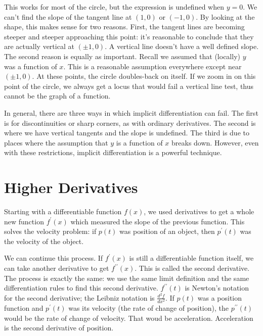 \documentclass[fleqn]{report}
\begin{document}
This works for most of the circle, but the expression is
undefined when $y=0$. We can't find the slope of the
tangent line at $(1,0)$ or $(-1,0)$. By looking at the shape,
this makes sense for two reasons. First, the tangent lines
are becoming steeper and steeper approaching this point: it's
reasonable to conclude that they are actually vertical at
$(\pm 1,0)$. A vertical line doesn't have a well defined
slope. The second reason is equally as important. Recall we
assumed that (locally) $y$ was a function of $x$. This is a
reasonable assumption everywhere except near $(\pm 1,0)$. At
these points, the circle doubles-back on itself. If we zoom
in on this point of the circle, we always get a locus that
would fail a vertical line test, thus cannot be the graph of a
function.

In general, there are three ways in which implicit
differentiation can fail. The first is for discontinuities or
sharp corners, as with ordinary derivatives. The second is
where we have vertical tangents and the slope is undefined.
The third is due to places where the assumption that $y$ is a
function of $x$ breaks down. However, even with these
restrictions, implicit differentiation is a powerful
technique.

\section{Higher Derivatives}
\label{higher-derivatives}

Starting with a differentiable function $f(x)$, we used
derivatives to get a whole new function $f^\prime(x)$ which
measured the slope of the previous function. This solves the
velocity problem: if $p(t)$ was position of an object, then
$p^\prime(t)$ was the velocity of the object. 

We can continue this process. If $f^\prime(x)$ is still a
differentiable function itself, we can take another derivative
to get $f^{\prime \prime}(x)$. This is called the second
derivative. The process is exactly the same: we use the same
limit definition and the same differentiation rules to find
this second derivative. $f^{\prime \prime}(t)$ is Newton's
notation for the second derivative; the Leibniz notation is
$\frac{d^2 f}{dx^2}.$ If $p(t)$ was a position function and
$p^\prime(t)$ was its velocity (the rate of change of
position), the $p^{\prime \prime}(t)$ would be the rate of
change of velocity. That woud be acceleration. Acceleration
is the second derivative of position. 
\end{document}
